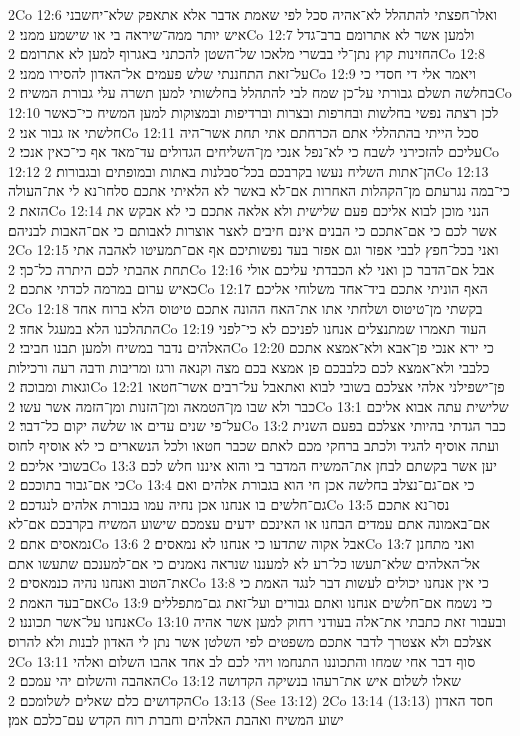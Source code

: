 2Co 12:6  ואלו־חפצתי להתהלל לא־אהיה סכל לפי שאמת אדבר אלא אתאפק שלא־יחשבני איש יותר ממה־שיראה בי או שישמע ממני׃
2Co 12:7  ולמען אשר לא אתרומם ברב־גדל החזינות קוץ נתן־לי בבשרי מלאכו של־השטן להכתני באגרוף למען לא אתרומם׃
2Co 12:8  על־זאת התחננתי שלש פעמים אל־האדון להסירו ממני׃
2Co 12:9  ויאמר אלי די חסדי כי בחלשה תשלם גבורתי על־כן שמח לבי להתהלל בחלשותי למען תשרה עלי גבורת המשיח׃
2Co 12:10  לכן רצתה נפשי בחלשות ובחרפות ובצרות וברדיפות ובמצוקות למען המשיח כי־כאשר חלשתי אז גבור אני׃
2Co 12:11  סכל הייתי בהתהללי אתם הכרחתם אתי תחת אשר־היה עליכם להזכירני לשבח כי לא־נפל אנכי מן־השליחים הגדולים עד־מאד אף כי־כאין אנכי׃
2Co 12:12  הן־אתות השליח נעשו בקרבכם בכל־סבלנות באתות ובמופתים ובגבורות׃
2Co 12:13  כי־במה נגרעתם מן־הקהלות האחרות אם־לא באשר לא הלאיתי אתכם סלחו־נא לי את־העולה הזאת׃
2Co 12:14  הנני מוכן לבוא אליכם פעם שלישית ולא אלאה אתכם כי לא אבקש את אשר לכם כי אם־אתכם כי הבנים אינם חיבים לאצר אוצרות לאבותם כי אם־האבות לבניהם׃
2Co 12:15  ואני בכל־חפץ לבבי אפזר וגם אפזר בעד נפשותיכם אף אם־תמעיטו לאהבה אתי תחת אהבתי לכם היתרה כל־כך׃
2Co 12:16  אבל אם־הדבר כן ואני לא הכבדתי עליכם אולי כאיש ערום במרמה לכדתי אתכם׃
2Co 12:17  האף הוניתי אתכם ביד־אחד משלוחי אליכם׃
2Co 12:18  בקשתי מן־טיטוס ושלחתי אתו את־האח ההונה אתכם טיטוס הלא ברוח אחד התהלכנו הלא במעגל אחד׃
2Co 12:19  העוד תאמרו שמתנצלים אנחנו לפניכם לא כי־לפני האלהים נדבר במשיח ולמען תבנו חביבי׃
2Co 12:20  כי ירא אנכי פן־אבא ולא־אמצא אתכם כלבבי ולא־אמצא לכם כלבבכם פן אמצא בכם מצה וקנאה ורגז ומריבות ודבה רעה ורכילות וגאות ומבוכה׃
2Co 12:21  פן־ישפילני אלהי אצלכם בשובי לבוא ואתאבל על־רבים אשר־חטאו כבר ולא שבו מן־הטמאה ומן־הזנות ומן־הזמה אשר עשו׃
2Co 13:1  שלישית עתה אבוא אליכם על־פי שנים עדים או שלשה יקום כל־דבר׃
2Co 13:2  כבר הגדתי בהיותי אצלכם בפעם השנית ועתה אוסיף להגיד ולכתב ברחקי מכם לאתם שכבר חטאו ולכל הנשארים כי לא אוסיף לחוס בשובי אליכם׃
2Co 13:3  יען אשר בקשתם לבחן את־המשיח המדבר בי והוא איננו חלש לכם כי אם־גבור בתוככם׃
2Co 13:4  כי אם־גם־נצלב בחלשה אכן חי הוא בגבורת אלהים ואם גם־חלשים בו אנחנו אכן נחיה עמו בגבורת אלהים לנגדכם׃
2Co 13:5  נסו־נא אתכם אם־באמונה אתם עמדים הבחנו או האינכם ידעים עצמכם שישוע המשיח בקרבכם אם־לא נמאסים אתם׃
2Co 13:6  אבל אקוה שתדעו כי אנחנו לא נמאסים׃
2Co 13:7  ואני מתחנן אל־האלהים שלא־תעשו כל־רע לא למעננו שנראה נאמנים כי אם־למענכם שתעשו אתם את־הטוב ואנחנו נהיה כנמאסים׃
2Co 13:8  כי אין אנחנו יכולים לעשות דבר לנגד האמת כי אם־בעד האמת׃
2Co 13:9  כי נשמח אם־חלשים אנחנו ואתם גבורים ועל־זאת גם־מתפללים אנחנו על־אשר תכוננו׃
2Co 13:10  ובעבור זאת כתבתי את־אלה בעודני רחוק למען אשר אהיה אצלכם ולא אצטרך לדבר אתכם משפטים לפי השלטן אשר נתן לי האדון לבנות ולא להרוס׃
2Co 13:11  סוף דבר אחי שמחו והתכוננו התנחמו ויהי לכם לב אחד אהבו השלום ואלהי האהבה והשלום יהי עמכם׃
2Co 13:12  שאלו לשלום איש את־רעהו בנשיקה הקדושה הקדושים כלם שאלים לשלומכם׃
2Co 13:13   (See 13:12)
2Co 13:14   (13:13) חסד האדון ישוע המשיח ואהבת האלהים וחברת רוח הקדש עם־כלכם אמן׃


